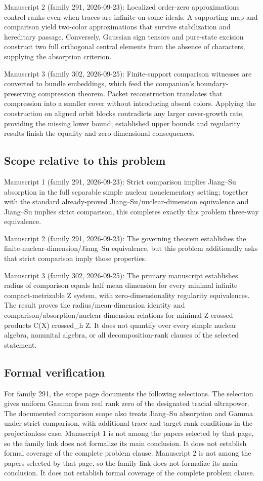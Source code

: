 \documentclass[11pt]{article}
\begin{document}
Manuscript 2 (family 291, 2026-09-23): Localized order-zero approximations control ranks even when traces are infinite on some ideals. A supporting map and comparison yield two-color approximations that survive stabilization and hereditary passage. Conversely, Gaussian sign tensors and pure-state excision construct two full orthogonal central elements from the absence of characters, supplying the absorption criterion.

Manuscript 3 (family 302, 2026-09-25): Finite-support comparison witnesses are converted to bundle embeddings, which feed the companion's boundary-preserving compression theorem. Packet reconstruction translates that compression into a smaller cover without introducing absent colors. Applying the construction on aligned orbit blocks contradicts any larger cover-growth rate, providing the missing lower bound; established upper bounds and regularity results finish the equality and zero-dimensional consequences.

\subsection{Scope relative to this problem}
Manuscript 1 (family 291, 2026-09-23): Strict comparison implies Jiang–Su absorption in the full separable simple nuclear nonelementary setting; together with the standard already-proved Jiang–Su/nuclear-dimension equivalence and Jiang–Su implies strict comparison, this completes exactly this problem three-way equivalence.

Manuscript 2 (family 291, 2026-09-23): The governing theorem establishes the finite-nuclear-dimension/Jiang–Su equivalence, but this problem additionally asks that strict comparison imply those properties.

Manuscript 3 (family 302, 2026-09-25): The primary manuscript establishes radius of comparison equals half mean dimension for every minimal infinite compact-metrizable Z system, with zero-dimensionality regularity equivalences. The result proves the radius/mean-dimension identity and comparison/absorption/nuclear-dimension relations for minimal Z crossed products C(X) crossed\_h Z. It does not quantify over every simple nuclear algebra, nonunital algebra, or all decomposition-rank clauses of the selected statement.

\subsection{Formal verification}
For family 291, the scope page documents the following selections. The selection gives uniform Gamma from real rank zero of the designated tracial ultrapower. The documented comparison scope also treats Jiang--Su absorption and Gamma under strict comparison, with additional trace and target-rank conditions in the projectionless case. Manuscript 1 is not among the papers selected by that page, so the family link does not formalize its main conclusion. It does not establish formal coverage of the complete problem clause. Manuscript 2 is not among the papers selected by that page, so the family link does not formalize its main conclusion. It does not establish formal coverage of the complete problem clause.
\end{document}
